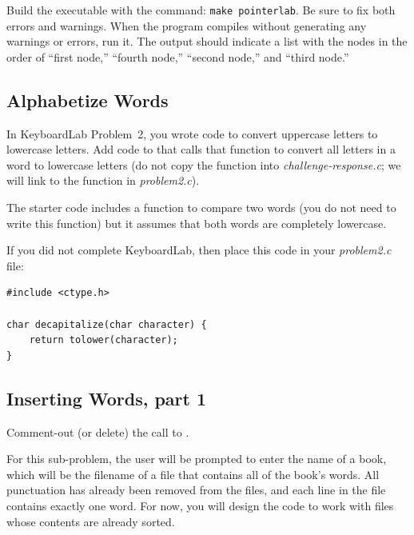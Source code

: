 

Build the executable with the command: \texttt{make pointerlab}.
Be sure to fix both errors and warnings.
When the program compiles without generating any warnings or errors, run it.
The output should indicate a list with the nodes in the order of ``first node,'' ``fourth node,'' ``second node,'' and ``third node.''

\subsection{Alphabetize Words}

In KeyboardLab Problem~2, you wrote code to convert uppercase letters to lowercase letters.
Add code to  that calls that function to convert all letters in a word to lowercase letters (do not copy the  function into \textit{challenge-response.c}; we will link to the function in \textit{problem2.c}).



The starter code includes a function to compare two words (you do not need to write this function) but it assumes that both words are completely lowercase.

If you did not complete KeyboardLab, then place this code in your \textit{problem2.c} file:

\begin{lstlisting}
#include <ctype.h>

char decapitalize(char character) {
    return tolower(character);
}
\end{lstlisting}

\subsection{Inserting Words, part 1}

Comment-out (or delete) the call to .

For this sub-problem, the user will be prompted to enter the name of a book, which will be the filename of a file that contains all of the book's words.
All punctuation has already been removed from the files, and each line in the file contains exactly one word.
For now, you will design the code to work with files whose contents are already sorted.

